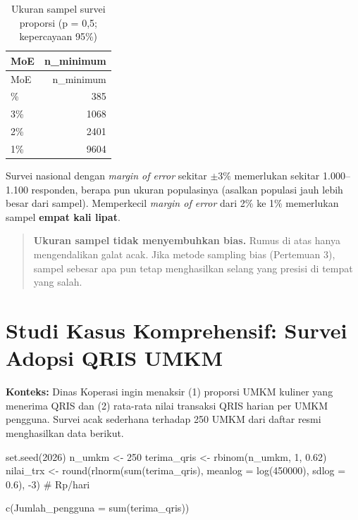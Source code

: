\documentclass[
  indonesian,
  letterpaper,
]{book}
\newenvironment{Shaded}{\begin{snugshade}}{\end{snugshade}}
\newcommand{\AttributeTok}[1]{\textcolor[rgb]{0.40,0.45,0.13}{#1}}
\newcommand{\CommentTok}[1]{\textcolor[rgb]{0.37,0.37,0.37}{#1}}
\newcommand{\DecValTok}[1]{\textcolor[rgb]{0.68,0.00,0.00}{#1}}
\newcommand{\FloatTok}[1]{\textcolor[rgb]{0.68,0.00,0.00}{#1}}
\newcommand{\FunctionTok}[1]{\textcolor[rgb]{0.28,0.35,0.67}{#1}}
\newcommand{\NormalTok}[1]{\textcolor[rgb]{0.00,0.23,0.31}{#1}}
\newcommand{\OtherTok}[1]{\textcolor[rgb]{0.00,0.23,0.31}{#1}}
\newcommand{\SpecialCharTok}[1]{\textcolor[rgb]{0.37,0.37,0.37}{#1}}
\begin{document}
\begin{longtable}[]{@{}lr@{}}
\caption{Ukuran sampel survei proporsi (p = 0,5; kepercayaan
95\%)}\tabularnewline
\toprule\noalign{}
MoE & n\_minimum \\
\midrule\noalign{}
\endfirsthead
\toprule\noalign{}
MoE & n\_minimum \\
\midrule\noalign{}
\endhead
\bottomrule\noalign{}
\endlastfoot
5\% & 385 \\
3\% & 1068 \\
2\% & 2401 \\
1\% & 9604 \\
\end{longtable}

Survei nasional dengan \emph{margin of error} sekitar \(\pm 3\%\)
memerlukan sekitar 1.000--1.100 responden, berapa pun ukuran populasinya
(asalkan populasi jauh lebih besar dari sampel). Memperkecil
\emph{margin of error} dari 2\% ke 1\% memerlukan sampel \textbf{empat
kali lipat}.

\begin{quote}
\textbf{Ukuran sampel tidak menyembuhkan bias.} Rumus di atas hanya
mengendalikan galat acak. Jika metode sampling bias (Pertemuan 3),
sampel sebesar apa pun tetap menghasilkan selang yang presisi di tempat
yang salah.
\end{quote}

\section{Studi Kasus Komprehensif: Survei Adopsi QRIS
UMKM}\label{studi-kasus-komprehensif-survei-adopsi-qris-umkm}

\textbf{Konteks:} Dinas Koperasi ingin menaksir (1) proporsi UMKM
kuliner yang menerima QRIS dan (2) rata-rata nilai transaksi QRIS harian
per UMKM pengguna. Survei acak sederhana terhadap 250 UMKM dari daftar
resmi menghasilkan data berikut.

\begin{Shaded}
\begin{Highlighting}[]
\FunctionTok{set.seed}\NormalTok{(}\DecValTok{2026}\NormalTok{)}
\NormalTok{n\_umkm }\OtherTok{\textless{}{-}} \DecValTok{250}
\NormalTok{terima\_qris }\OtherTok{\textless{}{-}} \FunctionTok{rbinom}\NormalTok{(n\_umkm, }\DecValTok{1}\NormalTok{, }\FloatTok{0.62}\NormalTok{)}
\NormalTok{nilai\_trx }\OtherTok{\textless{}{-}} \FunctionTok{round}\NormalTok{(}\FunctionTok{rlnorm}\NormalTok{(}\FunctionTok{sum}\NormalTok{(terima\_qris), }\AttributeTok{meanlog =} \FunctionTok{log}\NormalTok{(}\DecValTok{450000}\NormalTok{), }\AttributeTok{sdlog =} \FloatTok{0.6}\NormalTok{), }\SpecialCharTok{{-}}\DecValTok{3}\NormalTok{) }\CommentTok{\# Rp/hari}

\FunctionTok{c}\NormalTok{(}\AttributeTok{Jumlah\_pengguna =} \FunctionTok{sum}\NormalTok{(terima\_qris))}
\end{Highlighting}
\end{Shaded}
\end{document}
